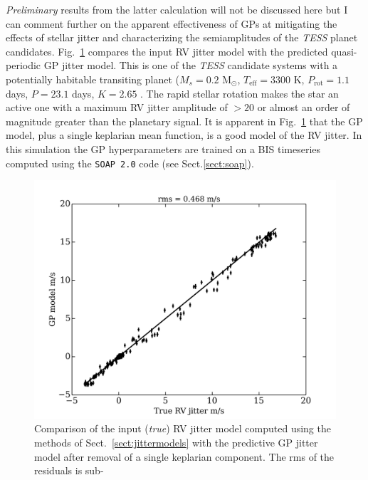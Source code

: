 \emph{Preliminary} results from the latter calculation will not be discussed here but 
I can comment further on the apparent effectiveness of GPs at mitigating the effects of 
stellar jitter and characterizing the semiamplitudes of the \emph{TESS} planet candidates. 
Fig.~\ref{fig:gpcomp} compares the input RV jitter model with the predicted quasi-periodic 
GP jitter model. This is one of the \emph{TESS} candidate systems with a potentially 
habitable transiting planet ($M_s=0.2$ M$_{\odot}$, $T_{\mathrm{eff}}=3300$ K, $P_{\mathrm{rot}}=1.1$ 
days, $P=23.1$ days, $K=2.65$ \mps{)}. The rapid stellar rotation makes the star an active 
one with 
a maximum RV jitter amplitude of $>20$ \mps{} or almost an order of magnitude greater than 
the planetary signal. It is apparent in Fig.~\ref{fig:gpcomp} 
that the GP model, plus a single keplarian mean function, is a good model of the RV jitter.
In this simulation the GP hyperparameters are trained on a BIS timeseries computed using 
the \texttt{SOAP 2.0} code (see Sect.\ref{sect:soap}). \\

\begin{figure}
\centering
\includegraphics[scale=.5]{figures/gpcomparison.png}
\caption{Comparison of the input (\emph{true}) RV jitter model computed using the methods 
of Sect.~\ref{sect:jittermodels} with the predictive GP jitter model after removal of a 
single keplarian component. The rms of the residuals is sub-
\label{fig:gpcomp}}
\end{figure}


